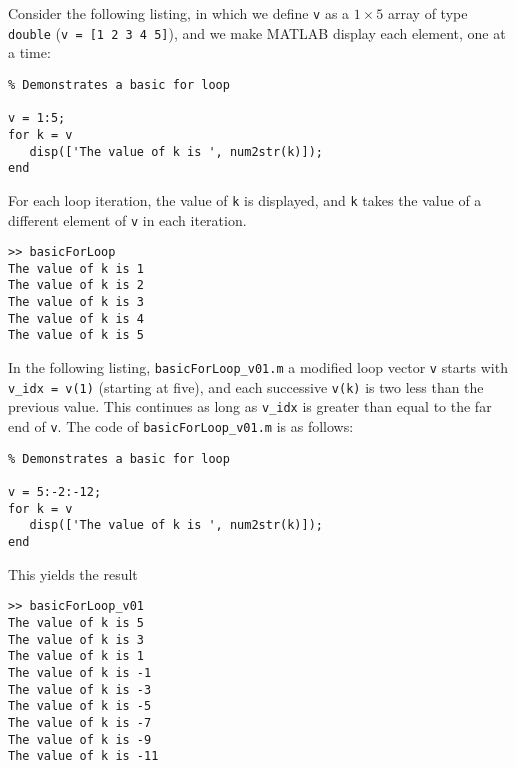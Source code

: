 Consider the following listing, in which we define \verb!v! as a $1\times 5$ array of type \texttt{double} (\verb!v = [1 2 3 4 5]!), and we make MATLAB display each element, one at a time:
\begin{lstlisting}[style=Matlab-editor, label={basicForLoop_listing}]
% basicForLoop.m
% Demonstrates a basic for loop

v = 1:5;
for k = v
   disp(['The value of k is ', num2str(k)]);
end
\end{lstlisting}
For each loop iteration, the value of \verb!k! is displayed, and \verb!k! takes the value of a different element of \verb!v! in each iteration. 
\begin{lstlisting}[style=Matlab-editor, label={basicForLoop_listing}]
>> basicForLoop
The value of k is 1
The value of k is 2
The value of k is 3
The value of k is 4
The value of k is 5
\end{lstlisting}

In the following listing, \verb!basicForLoop_v01.m! a modified loop vector \texttt{v} starts with \verb!v_idx = v(1)! (starting at five), and each successive \texttt{v(k)} is two less than the previous value. This continues as long as  \verb!v_idx! is greater than equal to the far end of \texttt{v}.
The code of \verb!basicForLoop_v01.m! is as follows:
\begin{lstlisting}[style=Matlab-editor, label={basicForLoop_v01_listing}]
% basicForLoop_v01.m
% Demonstrates a basic for loop

v = 5:-2:-12;
for k = v
   disp(['The value of k is ', num2str(k)]);
end
\end{lstlisting}
This yields the result
\begin{lstlisting}[style=Matlab-editor, label={basicForLoop_v01_listing}]
>> basicForLoop_v01
The value of k is 5
The value of k is 3
The value of k is 1
The value of k is -1
The value of k is -3
The value of k is -5
The value of k is -7
The value of k is -9
The value of k is -11
\end{lstlisting}

